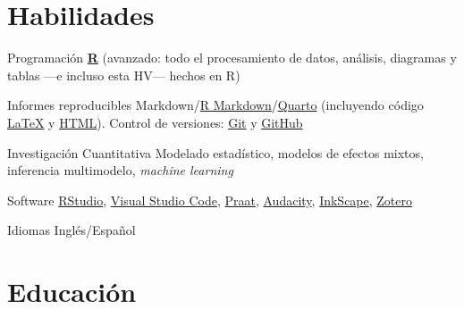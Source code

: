 \documentclass[11pt,a4paper,]{awesome-cv}
\begin{document}
\section{Habilidades}\label{habilidades}

\begin{cvskills}
  \cvskill
    {Programación}
    {\href{https://www.r-project.org/}{\textbf{R}} (avanzado: todo el procesamiento de datos, análisis, diagramas y tablas —e incluso esta HV— hechos en R)}

  \cvskill
    {Informes reproducibles}
    {Markdown/\href{https://rmarkdown.rstudio.com/}{R Markdown}/\href{https://quarto.org/}{Quarto} (incluyendo código  \href{https://www.latex-project.org/}{{\selectfont\LaTeX}} y \href{https://html.spec.whatwg.org/}{HTML}). Control de versiones: \href{https://git-scm.com/}{Git} \faGit* y \href{https://github.com/JDLeongomez}{GitHub} \faGithub}

  \cvskill
    {Investigación Cuantitativa}
    {Modelado estadístico, modelos de efectos mixtos, inferencia multimodelo, \textit{machine learning}}

  \cvskill
    {Software}
    {\href{https://posit.co/products/open-source/rstudio/}{RStudio}, \href{https://code.visualstudio.com/}{Visual Studio Code}, \href{https://www.fon.hum.uva.nl/praat/}{Praat}, \href{https://www.audacityteam.org/}{Audacity}, \href{https://inkscape.org/}{InkScape}, \href{https://www.zotero.org/}{Zotero}}

  \cvskill
    {Idiomas}
    {Inglés/Español}
\end{cvskills}

\section{Educación}\label{educaciuxf3n}

\begin{cventries}
    \vspace{-4.0mm}
    \vspace{-4.0mm}
    \vspace{-4.0mm}
\end{cventries}
\end{document}
